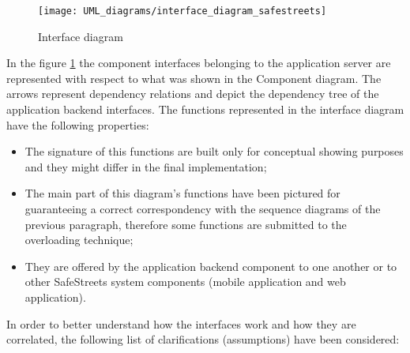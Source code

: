 \begin{figure}[H]
    \centering
    \texttt{[image: UML\_diagrams/interface\_diagram\_safestreets]}
    \caption{Interface diagram}
    \label{fig:interface_diagram}
\end{figure}
In the figure \ref{fig:interface_diagram} the component interfaces belonging to the application server are represented with respect to what was shown in the Component diagram. The arrows represent dependency relations and depict the dependency tree of the application backend interfaces. 
The functions represented in the interface diagram have the following properties:
\begin{itemize}
    \item The signature of this functions are built only for conceptual showing purposes and they might differ in the final implementation;
    \item The main part of this diagram's functions have been pictured for guaranteeing a correct correspondency with the sequence diagrams of the previous paragraph, therefore some functions are submitted to the overloading technique;
    \item They are offered by the application backend component to one another or to other SafeStreets system components (mobile application and web application).
\end{itemize} 
In order to better understand how the interfaces work and how they are correlated, the following list of clarifications (assumptions) have been considered:
